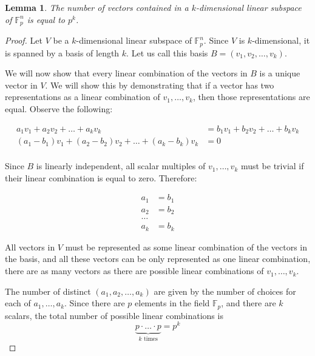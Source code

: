 \documentclass{article}
\newcommand{\F}{\mathbb{F}}
\newtheorem{lemma}[theorem]{Lemma}
\begin{document}
\section{}

\begin{lemma}
    \label{lemma:num_vecs}
    The number of vectors contained in a $k$-dimensional linear subspace of $\F_p^n$ is equal to $p^k$.
\end{lemma}

\begin{proof}
    Let $V$ be a $k$-dimensional linear subspace of $\F_p^n$. Since $V$ is $k$-dimensional, it is spanned by a basis of length $k$. Let us call this basis $B = (v_1, v_2, \dots, v_k)$.

    We will now show that every linear combination of the vectors in $B$ is a unique vector in $V$. We will show this by demonstrating that if a vector has two representations as a linear combination of $v_1, \dots, v_k$, then those representations are equal. Observe the following:

    \begin{align*}
        a_1 v_1 + a_2 v_2 + \dots + a_k v_k                         & = b_1 v_1 + b_2 v_2 + \dots + b_k v_k \\
        (a_1 - b_1) v_1 + (a_2 - b_2) v_2 + \dots + (a_k - b_k) v_k & = 0                                   \\
    \end{align*}

    Since $B$ is linearly independent, all scalar multiples of $v_1, \dots, v_k$ must be trivial if their linear combination is equal to zero. Therefore:

    \begin{align*}
        a_1 & = b_1 \\
        a_2 & = b_2 \\
        \dots       \\
        a_k & = b_k
    \end{align*}

    All vectors in $V$ must be represented as some linear combination of the vectors in the basis, and all these vectors can be only represented as one linear combination, there are as many vectors as there are possible linear combinations of $v_1, \dots, v_k$.

    The number of distinct $(a_1, a_2, \dots, a_k)$ are given by the number of choices for each of $a_1, \dots, a_k$. Since there are $p$ elements in the field $\F_p$, and there are $k$ scalars, the total number of possible linear combinations is \[\underbrace{p \cdot \ldots \cdot p}_{k \text{ times}} = p^k\]
\end{proof}
\end{document}

